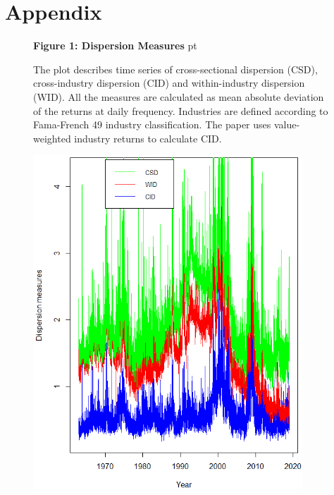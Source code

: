 \documentclass[12pt]{article}
\begin{document}
\newpage


\section*{Appendix}


\begin{figure}[h!]
\textbf{Figure 1: Dispersion Measures}
 pt
\begin{flushleft}
{The plot describes time series of cross-sectional dispersion (CSD), cross-industry dispersion (CID) and within-industry dispersion (WID). All the measures are calculated as mean absolute deviation of the returns at daily frequency. Industries are defined according to Fama-French 49 industry classification. The paper uses value-weighted industry returns to calculate CID.}
\end{flushleft}
\centering
\includegraphics[width=0.9\textwidth]{fig1.png}
\end{figure}
\end{document}
